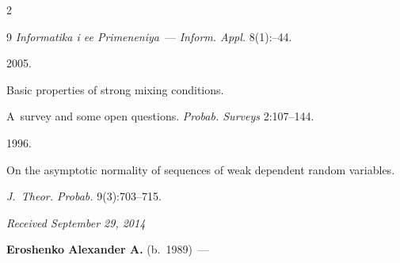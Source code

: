 \begin{multicols}{2}
{{\begin{thebibliography}{9}
\textit{Informatika i ee Primeneniya}~--- \textit{Inform. Appl.} 8(1):--44.





\smallskip







 2005.


Basic properties of strong mixing conditions.


A~survey and some open questions. \textit{Probab. Surveys}  2:107--144.





\smallskip







 1996.


On the asymptotic normality of sequences of weak dependent random variables.


\textit{J.~Theor. Probab.} 9(3):703--715.


\end{thebibliography}





 }


 }





\end{multicols}





\vspace*{-6pt}





\hfill{\small\textit{Received September 29, 2014}}





\vspace*{-18pt}





\Contr





\noindent


\textbf{Eroshenko Alexander A.} (b.\ 1989)~---


